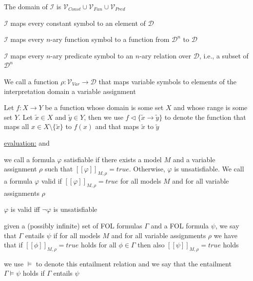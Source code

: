 \documentclass[landscape, a4paper]{article}
\begin{document}
\begin{minipage}[t]{0.2\linewidth}
\begin{betterlist}
\begin{betterlist}
			\begin{betterlist}
				\item The domain of $\mathcal{I}$ is $\mathcal{V}_{Const} \cup \mathcal{V}_{Fun} \cup \mathcal{V}_{Pred}$
				\item $\mathcal{I}$ maps every constant symbol to an element of $\mathcal{D}$
				\item $\mathcal{I}$ maps every $n$-ary function symbol to a function from $\mathcal{D}^n$ to $\mathcal{D}$
				\item $\mathcal{I}$ maps every $n$-ary predicate symbol to an $n$-ary relation over $\mathcal{D}$, i.e., a subset of $\mathcal{D}^n$
			\end{betterlist}
			We call a function $\rho : \mathcal{V}_{Var} \rightarrow \mathcal{D}$ that maps variable symbols to elements of the interpretation domain a \alert{variable assignment}
			\item Let $f : X \rightarrow Y$ be a function whose domain is some set $X$ and whose range is some set $Y$. Let $\tilde x \in X$ and $\tilde y \in Y$, then we use $f \triangleleft \{\tilde x \rightarrow \tilde y\}$ to denote the function that maps all $x \in X\setminus \{\tilde x\}$  to $f (x)$ and that maps $\tilde x$ to $\tilde y$
			\item \underline{evaluation:}  and 
		\end{betterlist}
		\item we call a formula $\varphi$ \alert{satisfiable} if there exists a model $M$ and a variable assignment $\rho$ such that $[[\varphi]]_{M,\rho} = true$. Otherwise, $\varphi$ is \alert{unsatisfiable}. We call a formula $\varphi$ \alert{valid} if $[[\varphi]]_{M,\rho} = true$ for all models $M$ and for all variable assignments $\rho$
		\begin{betterlist}
			\item $\varphi$ is valid iff $\neg \varphi$ is unsatisfiable
		\end{betterlist}
		\item given a (possibly infinite) set of FOL formulas $\Gamma$ and a FOL formula $\psi$, we say that $\Gamma$ \alert{entails} $\psi$ if for all models $M$ and for all variable assignments $\rho$ we have that if $[[\phi]]_{M,\rho} = true$ holds for all $\phi \in \Gamma$ then also $[[\psi]]_{M,\rho} = true$ holds
		\begin{betterlist}
			\item we use $\models$ to denote this entailment relation and we say that \alert{the entailment $\Gamma \models \psi$ holds} if $\Gamma$ entails $\psi$

\end{betterlist}
\end{betterlist}
\end{minipage}
\end{document}
